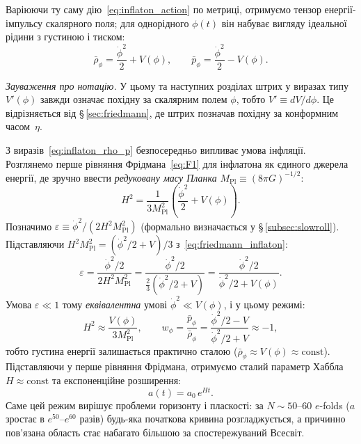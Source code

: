 \documentclass[12pt, a4paper]{article}
\begin{document}
Варіюючи ту саму дію~\eqref{eq:inflaton_action} по метриці,
отримуємо тензор енергії-імпульсу скалярного поля; для
однорідного $\phi(t)$ він набуває вигляду ідеальної рідини
з густиною і тиском:
\begin{equation}\label{eq:inflaton_rho_p}
  \bar{\rho}_\phi = \frac{\dot{\phi}^2}{2} + V(\phi),
  \qquad
  \bar{p}_\phi   = \frac{\dot{\phi}^2}{2} - V(\phi).
\end{equation}


\noindent
\textit{Зауваження про нотацію.} У цьому та наступних розділах
штрих у виразах типу $V'(\phi)$ завжди означає похідну за
скалярним полем $\phi$, тобто $V' \equiv dV/d\phi$. Це відрізняється
від §\,\ref{sec:friedmann}, де штрих позначав похідну за конформним
часом~$\eta$.

З виразів~\eqref{eq:inflaton_rho_p} безпосередньо випливає умова
інфляції. Розглянемо перше рівняння Фрідмана~\eqref{eq:F1} для
інфлатона як єдиного джерела енергії, де зручно ввести
\emph{редуковану масу Планка} $M_\mathrm{Pl} \equiv (8\pi G)^{-1/2}$:
\begin{equation}\label{eq:friedmann_inflaton}
  H^2 = \frac{1}{3M_\mathrm{Pl}^2}
        \left(\frac{\dot\phi^2}{2} + V(\phi)\right).
\end{equation}
Позначимо $\varepsilon \equiv \dot\phi^2/(2H^2 M_\mathrm{Pl}^2)$
(формально визначається у §\,\ref{subsec:slowroll}).
Підставляючи $H^2 M_\mathrm{Pl}^2 = (\dot\phi^2/2 + V)/3$
з~\eqref{eq:friedmann_inflaton}:
\begin{equation*}
  \varepsilon
    = \frac{\dot\phi^2/2}{2H^2 M_\mathrm{Pl}^2}
    = \frac{\dot\phi^2/2}{\tfrac{2}{3}(\dot\phi^2/2 + V)}
    = \frac{\dot\phi^2/2}{\dot\phi^2/2 + V(\phi)}.
\end{equation*}
Умова $\varepsilon \ll 1$ тому \emph{еквівалентна} умові
$\dot\phi^2 \ll V(\phi)$, і у цьому режимі:
\begin{equation*}
  H^2 \approx \frac{V(\phi)}{3M_\mathrm{Pl}^2}, \qquad
  w_\phi = \frac{\bar{p}_\phi}{\bar{\rho}_\phi}
         = \frac{\dot\phi^2/2 - V}{\dot\phi^2/2 + V} \approx -1,
\end{equation*}
тобто густина енергії залишається практично сталою
($\bar{\rho}_\phi \approx V(\phi) \approx \mathrm{const}$).
Підставляючи у перше рівняння Фрідмана, отримуємо
сталий параметр Хаббла $H \approx \mathrm{const}$ та
експоненційне розширення:
\begin{equation}\label{eq:a_exponential}
  a(t) = a_0\,e^{Ht}.
\end{equation}
Саме цей режим вирішує проблеми горизонту і пласкості: за $N \sim
50$--$60$ $e$-folds ($a$ зростає в $e^{50}$--$e^{60}$ разів)
будь-яка початкова кривина розгладжується, а причинно пов'язана
область стає набагато більшою за спостережуваний Всесвіт.
\end{document}
